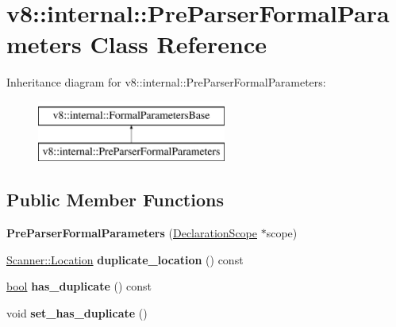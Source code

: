 \hypertarget{classv8_1_1internal_1_1PreParserFormalParameters}{}\section{v8\+:\+:internal\+:\+:Pre\+Parser\+Formal\+Parameters Class Reference}
\label{classv8_1_1internal_1_1PreParserFormalParameters}
Inheritance diagram for v8\+:\+:internal\+:\+:Pre\+Parser\+Formal\+Parameters\+:\begin{figure}[H]
\begin{center}
\leavevmode
\includegraphics[height=2.000000cm]{classv8_1_1internal_1_1PreParserFormalParameters}
\end{center}
\end{figure}
\subsection*{Public Member Functions}
\begin{DoxyCompactItemize}
\item 
\mbox{\label{classv8_1_1internal_1_1PreParserFormalParameters_adf29daad53f210175ef14bea1b658a2d}} 
{\bfseries Pre\+Parser\+Formal\+Parameters} (\mbox{\hyperlink{classv8_1_1internal_1_1DeclarationScope}{Declaration\+Scope}} $\ast$scope)
\item 
\mbox{\label{classv8_1_1internal_1_1PreParserFormalParameters_a2fc6f105429062b2269ad2fcdb6bc6db}} 
\mbox{\hyperlink{structv8_1_1internal_1_1Scanner_1_1Location}{Scanner\+::\+Location}} {\bfseries duplicate\+\_\+location} () const
\item 
\mbox{\label{classv8_1_1internal_1_1PreParserFormalParameters_a151eb9003fdf9c283680307fb02a5f08}} 
\mbox{\hyperlink{classbool}{bool}} {\bfseries has\+\_\+duplicate} () const
\item 
\mbox{\label{classv8_1_1internal_1_1PreParserFormalParameters_aa132cf5b420c37b2df15a40fa7746b06}} 
void {\bfseries set\+\_\+has\+\_\+duplicate} ()
\end{DoxyCompactItemize}
